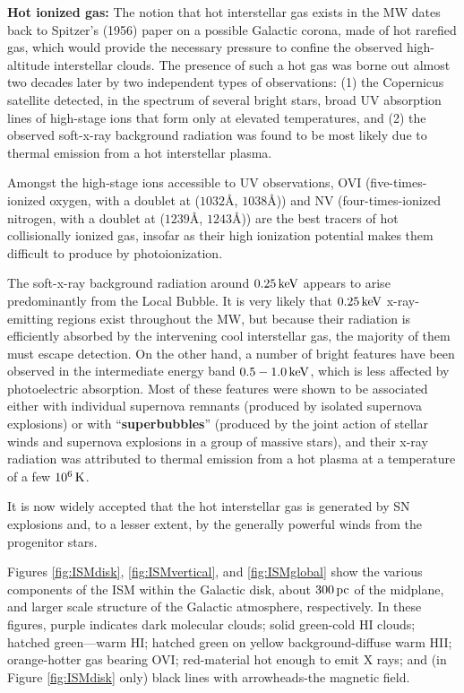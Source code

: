 \documentclass[a4paper,10pt]{article}
\begin{document}
{\noindent}\textbf{Hot ionized gas:} The notion that hot interstellar gas exists in the MW dates back to Spitzer's (1956) paper on a possible Galactic corona, made of hot rarefied gas, which would provide the necessary pressure to confine the observed high-altitude interstellar clouds. The presence of such a hot gas was borne out almost two decades later by two independent types of observations: (1) the Copernicus satellite detected, in the spectrum of several bright stars, broad UV absorption lines of high-stage ions that form only at elevated temperatures, and (2) the observed soft-x-ray background radiation was found to be most likely due to thermal emission from a hot interstellar plasma.

{\noindent}Amongst the high-stage ions accessible to UV observations, OVI (five-times-ionized oxygen, with a doublet at ($1032$\AA, $1038$\AA)) and NV (four-times-ionized nitrogen, with a doublet at ($1239$\AA, $1243$\AA)) are the best tracers of hot collisionally ionized gas, insofar as their high ionization potential makes them difficult to produce by photoionization.

{\noindent}The soft-x-ray background radiation around $0.25\,{\rm keV}$ appears to arise predominantly from the Local Bubble. It is very likely that $0.25\,{\rm keV}$ x-ray-emitting regions exist throughout the MW, but because their radiation is efficiently absorbed by the intervening cool interstellar gas, the majority of them must escape detection. On the other hand, a number of bright features have been observed in the intermediate energy band $0.5-1.0\,{\rm keV}$, which is less affected by photoelectric absorption. Most of these features were shown to be associated either with individual supernova remnants (produced by isolated supernova explosions) or with ``\textbf{superbubbles}'' (produced by the joint action of stellar winds and supernova explosions in a group of massive stars), and their x-ray radiation was attributed to thermal emission from a hot plasma at a temperature of a few $10^6\,{\rm K}$.

{\noindent}It is now widely accepted that the hot interstellar gas is generated by SN explosions and, to a lesser extent, by the generally powerful winds from the progenitor stars.

{\noindent}Figures \ref{fig:ISMdisk}, \ref{fig:ISMvertical}, and \ref{fig:ISMglobal} show the various components of the ISM within the Galactic disk, about $300\,{\rm pc}$ of the midplane, and larger scale structure of the Galactic atmosphere, respectively. In these figures, purple indicates dark molecular clouds; solid green-cold HI clouds; hatched green—warm HI; hatched green on yellow background-diffuse warm HII; orange-hotter gas bearing OVI; red-material hot enough to emit X rays; and (in Figure \ref{fig:ISMdisk} only) black lines with arrowheads-the magnetic field.
\end{document}

